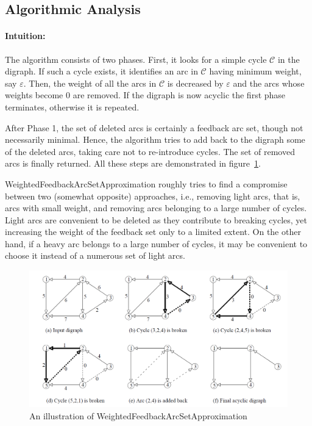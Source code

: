 \documentclass{article}
\begin{document}
\subsection{Algorithmic Analysis}

\paragraph{Intuition:} The algorithm consists of two phases. First, it looks for a simple cycle $\mathcal{C}$ in the digraph. If such a cycle exists, it identifies an arc in $\mathcal{C}$ having minimum weight, say $\varepsilon$. Then, the weight of all the arcs in $\mathcal{C}$ is decreased by $\varepsilon$ and the arcs
whose weights become 0 are removed. If the digraph is now acyclic the first phase terminates, otherwise it is repeated.

After Phase 1, the set of deleted arcs is certainly a feedback arc set, though not necessarily minimal. Hence, the algorithm tries to add back to the digraph some of the deleted arcs, taking care not to re-introduce cycles. The set of removed arcs is finally returned. All these steps are demonstrated in figure~\ref{fig:my_fig}.

{\sc WeightedFeedbackArcSetApproximation} roughly tries to find a compromise between two (somewhat opposite) approaches, i.e., removing light arcs, that is, arcs with small weight, and removing arcs belonging to a large number of cycles. Light arcs are convenient to be deleted as they contribute to breaking cycles, yet increasing the weight of the feedback set only to a limited extent. On the other hand, if a heavy arc belongs to a large number of cycles, it may be convenient to choose it instead of a numerous set of light arcs.

\begin{figure}[H]
    \centering
    \includegraphics[scale=0.5]{figures/fas-steps.png}
    \caption{An illustration of {\sc WeightedFeedbackArcSetApproximation}}
    \label{fig:my_fig}
\end{figure}
\end{document}
